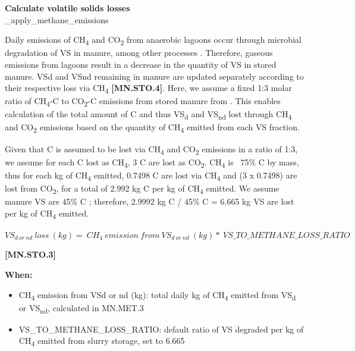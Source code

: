 \begin{refsection}
\begin{itemize}
    \end{itemize}
    \vspace{0.5cm}

\textbf{Calculate volatile solids losses}\\
\_apply\_methane\_emissions
\vspace{0.2cm}

Daily emissions of CH\textsubscript{4} and CO\textsubscript{2} from anaerobic lagoons occur through microbial degradation of VS in manure, among other processes \parencite{Petersen2024}. Therefore, gaseous emissions from lagoons result in a decrease in the quantity of VS in stored manure. VSd and VSnd remaining in manure are updated separately according to their respective loss via CH\textsubscript{4} \textbf{[MN.STO.4]}. Here, we assume a fixed 1:3 molar ratio of CH\textsubscript{4}-C to CO\textsubscript{2}-C emissions from stored manure from \cite{Petersen2024}. This enables calculation of the total amount of C and thus VS\textsubscript{d} and VS\textsubscript{nd} lost through CH\textsubscript{4} and CO\textsubscript{2} emissions based on the quantity of CH\textsubscript{4} emitted from each VS fraction.
\vspace{0.2cm}

Given that C is assumed to be lost via CH\textsubscript{4} and CO\textsubscript{2} emissions in a ratio of 1:3, we assume for each C lost as CH\textsubscript{4}, 3 C are lost as CO\textsubscript{2}. CH\textsubscript{4} is ~75\% C by mass, thus for each kg of CH\textsubscript{4} emitted, 0.7498 C are lost via CH\textsubscript{4} and (3 x 0.7498) are lost from CO\textsubscript{2}, for a total of 2.992 kg C per kg of CH\textsubscript{4} emitted. We assume manure VS are 45\% C \parencite{Petersen2024}; therefore, 2.9992 kg C / 45\% C = 6.665 kg VS are lost per kg of CH\textsubscript{4} emitted.
\vspace{0.5cm}

    \begin{center}
        \(VS_{d\ or\ nd}\ loss\ (kg)=\ CH_{4}\ emission\ from\ VS_{d\ or\ nd}\ (kg)*\ VS\_TO\_METHANE\_LOSS\_RATIO\)
    \end{center}
        \vspace{0.5cm} 
    
            {\raggedleft \textbf{[MN.STO.3]}\par}
            \vspace{0.5cm}

    \textbf{When:}
    \begin{itemize}
        \item CH\textsubscript{4} emission from VSd or nd (kg): total daily kg of CH\textsubscript{4} emitted from VS\textsubscript{d} or VS\textsubscript{nd}, calculated in MN.MET.3
        \item VS\_TO\_METHANE\_LOSS\_RATIO: default ratio of VS degraded per kg of CH\textsubscript{4} emitted from slurry storage, set to 6.665


\end{itemize}
\end{refsection}
